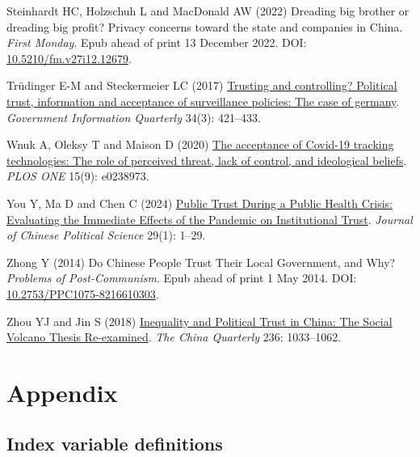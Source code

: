 \documentclass[
  letterpaper,
  DIV=11,
  numbers=noendperiod]{scrartcl}
\newlength{\cslhangindent}
\newenvironment{CSLReferences}[2] %
 {\begin{list}{}{%
  \setlength{\itemindent}{0pt}
  \setlength{\leftmargin}{0pt}
  \setlength{\parsep}{0pt}
  \ifodd #1
   \setlength{\leftmargin}{\cslhangindent}
   \setlength{\itemindent}{-1\cslhangindent}
  \fi
  \setlength{\itemsep}{#2\baselineskip}}}
 {\end{list}}
\begin{document}
\begin{CSLReferences}{1}{1}
Steinhardt HC, Holzschuh L and MacDonald AW (2022) Dreading big brother
or dreading big profit? Privacy concerns toward the state and companies
in China. \emph{First Monday}. Epub ahead of print 13 December 2022.
DOI:
\href{https://doi.org/10.5210/fm.v27i12.12679}{10.5210/fm.v27i12.12679}.

Trüdinger E-M and Steckermeier LC (2017)
\href{https://doi.org/10.1016/j.giq.2017.07.003}{Trusting and
controlling? Political trust, information and acceptance of surveillance
policies: The case of germany}. \emph{Government Information Quarterly}
34(3): 421--433.

Wnuk A, Oleksy T and Maison D (2020)
\href{https://doi.org/10.1371/journal.pone.0238973}{The acceptance of
Covid-19 tracking technologies: The role of perceived threat, lack of
control, and ideological beliefs}. \emph{PLOS ONE} 15(9): e0238973.

You Y, Ma D and Chen C (2024)
\href{https://doi.org/10.1007/s11366-023-09874-y}{Public Trust During a
Public Health Crisis: Evaluating the Immediate Effects of the Pandemic
on Institutional Trust}. \emph{Journal of Chinese Political Science}
29(1): 1--29.

Zhong Y (2014) Do Chinese People Trust Their Local Government, and Why?
\emph{Problems of Post-Communism}. Epub ahead of print 1 May 2014. DOI:
\href{https://doi.org/10.2753/PPC1075-8216610303}{10.2753/PPC1075-8216610303}.

Zhou YJ and Jin S (2018)
\href{https://doi.org/10.1017/S0305741018001297}{Inequality and
Political Trust in China: The Social Volcano Thesis Re-examined}.
\emph{The China Quarterly} 236: 1033--1062.

\end{CSLReferences}

\newpage{}

\section{Appendix}\label{sec-appendix}

\subsection{Index variable
definitions}\label{index-variable-definitions}
\end{document}
